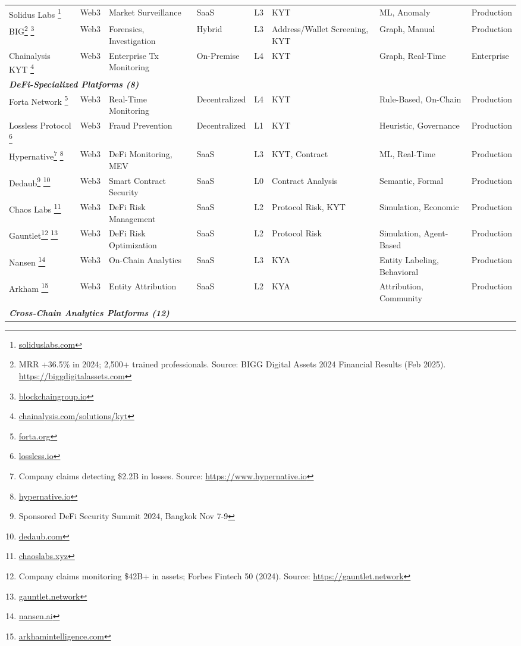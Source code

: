 \documentclass[conference,compsoc]{IEEEtran}
\begin{document}
\begin{table}[htbp]
\begin{tabularx}{\textwidth}{p{1.5cm}p{0.9cm}X p{1.1cm}p{1.2cm}p{1.1cm}X p{0.9cm}}
Solidus Labs \footnote{\url{soliduslabs.com}} & Web3 & Market Surveillance & SaaS & L3 & KYT & ML, Anomaly & Production \\
BIG\footnote{MRR +36.5\% in 2024; 2,500+ trained professionals. Source: BIGG Digital Assets 2024 Financial Results (Feb 2025). \url{https://biggdigitalassets.com}} \footnote{\url{blockchaingroup.io}} & Web3 & Forensics, Investigation & Hybrid & L3 & Address/Wallet Screening, KYT & Graph, Manual & Production \\
Chainalysis KYT \footnote{\url{chainalysis.com/solutions/kyt}} & Web3 & Enterprise Tx Monitoring & On-Premise & L4 & KYT & Graph, Real-Time & Enterprise \\
\hline
\multicolumn{8}{l}{\textit{\textbf{DeFi-Specialized Platforms (8)}}} \\
\hline
Forta Network \footnote{\url{forta.org}} & Web3 & Real-Time Monitoring & Decentralized & L4 & KYT & Rule-Based, On-Chain & Production \\
Lossless Protocol \footnote{\url{lossless.io}} & Web3 & Fraud Prevention & Decentralized & L1 & KYT & Heuristic, Governance & Production \\
Hypernative\footnote{Company claims detecting \$2.2B in losses. Source: \url{https://www.hypernative.io}} \footnote{\url{hypernative.io}} & Web3 & DeFi Monitoring, MEV & SaaS & L3 & KYT, Contract & ML, Real-Time & Production \\
Dedaub\footnote{Sponsored DeFi Security Summit 2024, Bangkok Nov 7-9} \footnote{\url{dedaub.com}} & Web3 & Smart Contract Security & SaaS & L0 & Contract Analysis & Semantic, Formal & Production \\
Chaos Labs \footnote{\url{chaoslabs.xyz}} & Web3 & DeFi Risk Management & SaaS & L2 & Protocol Risk, KYT & Simulation, Economic & Production \\
Gauntlet\footnote{Company claims monitoring \$42B+ in assets; Forbes Fintech 50 (2024). Source: \url{https://gauntlet.network}} \footnote{\url{gauntlet.network}} & Web3 & DeFi Risk Optimization & SaaS & L2 & Protocol Risk & Simulation, Agent-Based & Production \\
Nansen \footnote{\url{nansen.ai}} & Web3 & On-Chain Analytics & SaaS & L3 & KYA & Entity Labeling, Behavioral & Production \\
Arkham \footnote{\url{arkhamintelligence.com}} & Web3 & Entity Attribution & SaaS & L2 & KYA & Attribution, Community & Production \\
\hline
\multicolumn{8}{l}{\textit{\textbf{Cross-Chain Analytics Platforms (12)}}} \\

\end{tabularx}
\end{table}
\end{document}
